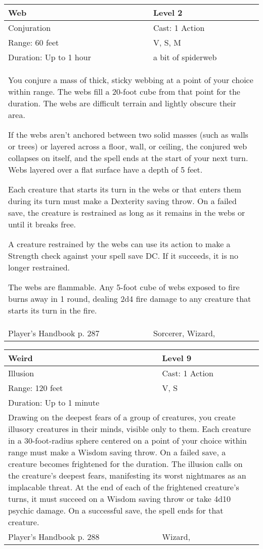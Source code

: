 \documentclass[11pt]{report}
\begin{document}
\begin{table}[H]
	\begin{tabular}{||p{6cm}|p{6cm}||}
		\hline\hline
		\bf{Web} & Level 2\\ \hline
		Conjuration & Cast: 1 Action\\ \hline
		Range: 60 feet & V, S, M\\ \hline
		Duration: Up to 1 hour & a bit of spiderweb\\ \hline
		\multicolumn{2}{||p{12cm}||}{You conjure a mass of thick, sticky webbing at a point of your choice within range.
The webs fill a 20-foot cube from that point for the duration. The webs are difficult terrain and lightly obscure their area.

If the webs aren’t anchored between two solid masses (such as walls or trees) or layered across a floor, wall, or ceiling, the conjured web collapses on itself, and the spell ends at the start of your next turn. Webs layered over a flat surface have a depth of 5 feet.

Each creature that starts its turn in the webs or that enters them during its turn must make a Dexterity saving throw. On a failed save, the creature is restrained as long as it remains in the webs or until it breaks free.

A creature restrained by the webs can use its action to make a Strength check against your spell save DC. If it succeeds, it is no longer restrained.

The webs are flammable. Any 5-foot cube of webs exposed to fire burns away in 1 round, dealing 2d4 fire damage to any creature that starts its turn in the fire.}\\ \hline
Player's Handbook p. 287 & Sorcerer, Wizard, \\ \hline\hline
	\end{tabular}
\end{table}

\begin{table}[H]
	\begin{tabular}{||p{6cm}|p{6cm}||}
		\hline\hline
		\bf{Weird} & Level 9\\ \hline
		Illusion & Cast: 1 Action\\ \hline
		Range: 120 feet & V, S\\ \hline
		Duration: Up to 1 minute & \\ \hline
		\multicolumn{2}{||p{12cm}||}{Drawing on the deepest fears of a group of creatures, you create illusory creatures in their minds, visible only to them.
Each creature in a 30-foot-radius sphere centered on a point of your choice within range must make a Wisdom saving throw. On a failed save, a creature becomes frightened for the duration.
The illusion calls on the creature’s deepest fears, manifesting its worst nightmares as an implacable threat. At the end of each of the frightened creature’s turns, it must succeed on a Wisdom saving throw or take 4d10 psychic damage. On a successful save, the spell ends for that creature.}\\ \hline
Player's Handbook p. 288 & Wizard, \\ \hline\hline
	\end{tabular}
\end{table}
\end{document}
